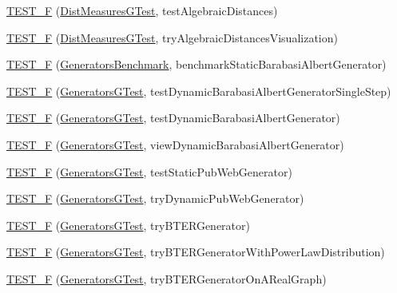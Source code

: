 \begin{DoxyCompactItemize}
\hyperlink{namespace_networ_kit_a9fc1c3239d8886ab627b70602ef49a72}{T\-E\-S\-T\-\_\-\-F} (\hyperlink{class_networ_kit_1_1_dist_measures_g_test}{Dist\-Measures\-G\-Test}, test\-Algebraic\-Distances)
\item 
\hyperlink{namespace_networ_kit_a59d457a890c8c0f184036b394126f7ba}{T\-E\-S\-T\-\_\-\-F} (\hyperlink{class_networ_kit_1_1_dist_measures_g_test}{Dist\-Measures\-G\-Test}, try\-Algebraic\-Distances\-Visualization)
\item 
\hyperlink{namespace_networ_kit_ad701be5e0f6ca1052eb0e35bb4b9ac56}{T\-E\-S\-T\-\_\-\-F} (\hyperlink{class_networ_kit_1_1_generators_benchmark}{Generators\-Benchmark}, benchmark\-Static\-Barabasi\-Albert\-Generator)
\item 
\hyperlink{namespace_networ_kit_ada2bab8675baab4fe036da90013b0deb}{T\-E\-S\-T\-\_\-\-F} (\hyperlink{class_networ_kit_1_1_generators_g_test}{Generators\-G\-Test}, test\-Dynamic\-Barabasi\-Albert\-Generator\-Single\-Step)
\item 
\hyperlink{namespace_networ_kit_abe2d8bf3e851efa5271001a39bb48aef}{T\-E\-S\-T\-\_\-\-F} (\hyperlink{class_networ_kit_1_1_generators_g_test}{Generators\-G\-Test}, test\-Dynamic\-Barabasi\-Albert\-Generator)
\item 
\hyperlink{namespace_networ_kit_a600268a3a989d9972047355a8a4061a9}{T\-E\-S\-T\-\_\-\-F} (\hyperlink{class_networ_kit_1_1_generators_g_test}{Generators\-G\-Test}, view\-Dynamic\-Barabasi\-Albert\-Generator)
\item 
\hyperlink{namespace_networ_kit_a1f75114c9ae3e481de00ddef7fb63290}{T\-E\-S\-T\-\_\-\-F} (\hyperlink{class_networ_kit_1_1_generators_g_test}{Generators\-G\-Test}, test\-Static\-Pub\-Web\-Generator)
\item 
\hyperlink{namespace_networ_kit_afacb783a46e3e79b0349dacec3095162}{T\-E\-S\-T\-\_\-\-F} (\hyperlink{class_networ_kit_1_1_generators_g_test}{Generators\-G\-Test}, try\-Dynamic\-Pub\-Web\-Generator)
\item 
\hyperlink{namespace_networ_kit_a4245f97f43b25d81a65af8e283c28341}{T\-E\-S\-T\-\_\-\-F} (\hyperlink{class_networ_kit_1_1_generators_g_test}{Generators\-G\-Test}, try\-B\-T\-E\-R\-Generator)
\item 
\hyperlink{namespace_networ_kit_a4bf8f8e3335dfdb684d5df0416f8e737}{T\-E\-S\-T\-\_\-\-F} (\hyperlink{class_networ_kit_1_1_generators_g_test}{Generators\-G\-Test}, try\-B\-T\-E\-R\-Generator\-With\-Power\-Law\-Distribution)
\item 
\hyperlink{namespace_networ_kit_aef86c8d3d2135038f6fb3d9b0b889464}{T\-E\-S\-T\-\_\-\-F} (\hyperlink{class_networ_kit_1_1_generators_g_test}{Generators\-G\-Test}, try\-B\-T\-E\-R\-Generator\-On\-A\-Real\-Graph)

\end{DoxyCompactItemize}
